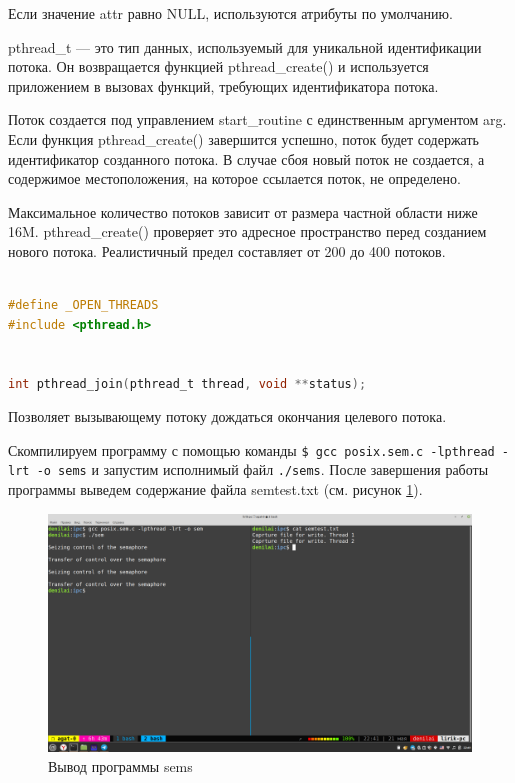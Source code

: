 \documentclass[a4paper,14pt]{extarticle}
\begin{document}
Если значение attr равно NULL, используются атрибуты по умолчанию. 

pthread\_t --- это тип данных, используемый для уникальной идентификации потока. Он возвращается функцией pthread\_create() и используется приложением в вызовах функций, требующих идентификатора потока.

Поток создается под управлением start\_routine с единственным аргументом arg. Если функция pthread\_create() завершится успешно, поток будет содержать идентификатор созданного потока. В случае сбоя новый поток не создается, а содержимое местоположения, на которое ссылается поток, не определено.


Максимальное количество потоков зависит от размера частной области ниже 16M. pthread\_create() проверяет это адресное пространство перед созданием нового потока. Реалистичный предел составляет от 200 до 400 потоков.

\begin{lstlisting}[language=C]

#define _OPEN_THREADS
#include <pthread.h>


int pthread_join(pthread_t thread, void **status);


\end{lstlisting}

Позволяет вызывающему потоку дождаться окончания целевого потока.


Скомпилируем программу с помощью команды \texttt{\$ gcc posix.sem.c -lpthread -lrt -o sems} и запустим исполнимый файл \texttt{./sems}. После завершения работы программы выведем содержание файла semtest.txt (см. рисунок \ref{fig:sems}).

\begin{figure}[h!]
	\centering
	\includegraphics[width=0.9\linewidth]{images/6/sems}
	\caption{Вывод программы sems}
	\label{fig:sems}
\end{figure}
\end{document}
